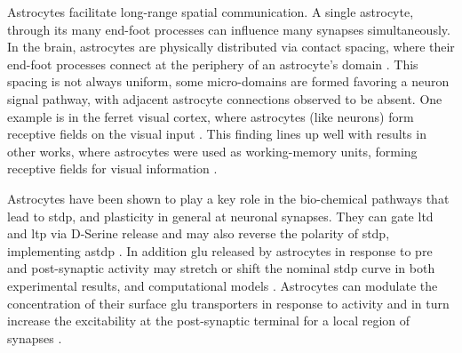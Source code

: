 \documentclass[conference]{IEEEtran}
\begin{document}
Astrocytes facilitate long-range spatial communication. A single astrocyte,
through its many end-foot processes can influence many synapses
simultaneously. In the brain, astrocytes are physically distributed via contact
spacing, where their end-foot processes connect at the periphery of an
astrocyte's domain \parencite{pitta_2012}. This spacing is not always uniform,
some micro-domains are formed favoring a neuron signal pathway, with adjacent
astrocyte connections observed to be absent. One example is in the ferret visual
cortex, where astrocytes (like neurons) form receptive fields on the visual
input \parencite{pitta_2012}. This finding lines up well with results in other
works, where astrocytes were used as working-memory units, forming receptive
fields for visual information \parencite{gordleeva_2021}.


Astrocytes have been shown to play a key role in the bio-chemical pathways that
lead to \gls{stdp}, and plasticity in general at neuronal synapses. They can
gate \gls{ltd} and \gls{ltp} via D-Serine release \parencite{manninen_2019} and
may also reverse the polarity of \gls{stdp}, implementing \gls{astdp}
\parencite{min_2012}. In addition \Gls{glu} released by astrocytes in response
to pre and post-synaptic activity may stretch or shift the nominal \gls{stdp}
curve in both experimental results, and computational models
\parencite{pitta_2016}. Astrocytes can modulate the concentration of their
surface \gls{glu} transporters in response to activity and in turn increase the
excitability at the post-synaptic terminal for a local region of synapses
\parencite{mederos_2018}.
\end{document}
